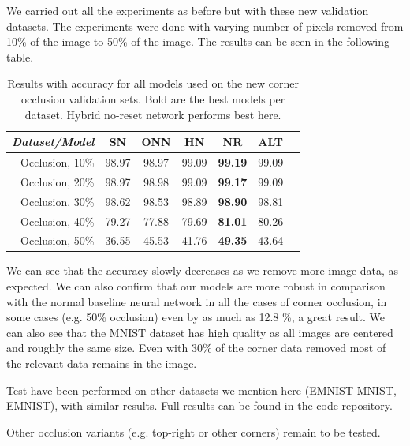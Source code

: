 \documentclass[b5paper]{book}
\begin{document}
We carried out all the experiments as before but with these new validation datasets. The experiments were done with varying number of pixels removed from 10\% of the image to 50\% of the image. The results can be seen in the following table.

\begin{table}[ht]
  \centering
  \begin{tabular}{rS[table-format=2.1]S[table-format=2.1]S[table-format=2.1]S[table-format=2.1]S[table-format=2.1]S[table-format=2.1]}
    \toprule
     \textit{Dataset/Model} & SN & ONN & HN & NR & ALT \\
    \midrule
    {Occlusion, 10\%} & {98.97} & {98.97} & {99.09} & \textbf{{99.19}} & {99.09} \\
    {Occlusion, 20\%} & {98.97} & {98.98} & {99.09} & \textbf{{99.17}} & {99.09} \\
    {Occlusion, 30\%} & {98.62} & {98.53} & {98.89} & \textbf{{98.90}} & {98.81} \\
    {Occlusion, 40\%} & {79.27} & {77.88} & {79.69} & \textbf{{81.01}} & {80.26} \\
    {Occlusion, 50\%} & {36.55} & {45.53} & {41.76} & \textbf{{49.35}} & {43.64} \\
    
    \bottomrule
  \end{tabular}
  \caption{Results with accuracy for all models used on the new corner occlusion validation sets. Bold are the best models per dataset. Hybrid no-reset network performs best here.}
  \label{tab:results-corner}
\end{table} 

We can see that the accuracy slowly decreases as we remove more image data, as expected. We can also confirm that our models are more robust in comparison with the normal baseline neural network in all the cases of corner occlusion, in some cases (e.g. 50\% occlusion) even by as much as 12.8 \%, a great result. We can also see that the MNIST dataset has high quality as all images are centered and roughly the same size. Even with 30\% of the corner data removed most of the relevant data remains in the image.

Test have been performed on other datasets we mention here (EMNIST-MNIST, EMNIST), with similar results. Full results can be found in the code repository.

Other occlusion variants (e.g. top-right or other corners) remain to be tested. 
\end{document}
